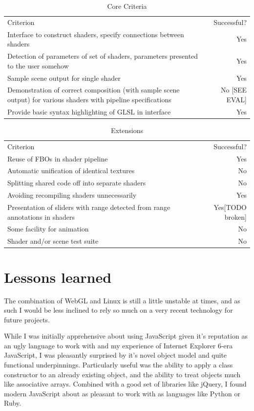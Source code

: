 \documentclass[12pt,twoside,notitlepage]{report}
\begin{document}
\begin{table}
\begin{tabular}{p{9cm} | r}
Criterion & Successful? \\
Interface to construct shaders, specify connections between shaders & Yes \\
Detection of parameters of set of shaders, parameters presented to the user somehow & Yes \\
Sample scene output for single shader & Yes \\
Demonstration of correct composition (with sample scene output) for various shaders with pipeline specifications & No [SEE EVAL]\\
Provide basic syntax highlighting of GLSL in interface & Yes \\
\end{tabular}
\caption{Core Criteria\label{core_t}}
\end{table}
\begin{table}
\begin{tabular}{p{9cm} | r}
Criterion & Successful? \\
Reuse of FBOs in shader pipeline & Yes \\
Automatic unification of identical textures & No \footnotemark[1] \\
Splitting shared code off into separate shaders & No \footnotemark[2] \\
Avoiding recompiling shaders unnecessarily & Yes \\
Presentation of sliders with range detected from range annotations in shaders & Yes[TODO broken]\\
Some facility for animation & No \\
Shader and/or scene test suite & No \\
\end{tabular}
\caption{Extensions\label{ext_t}}
\end{table}
\section{Lessons learned}
The combination of WebGL and Linux is still a little unstable at times, and as such I would be less inclined to rely so much on a very recent technology for future projects.

While I was initially apprehensive about using JavaScript given it's reputation as an ugly language to work with and my experience of Internet Explorer 6-era JavaScript, I was pleasantly surprised by it's novel object model and quite functional underpinnings. Particularly useful was the ability to apply a class constructor to an already existing object, and the ability to treat objects much like associative arrays. Combined with a good set of libraries like jQuery, I found modern JavaScript about as pleasant to work with as languages like Python or Ruby.
\end{document}
